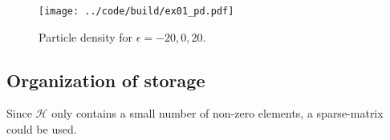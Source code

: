 \begin{figure}[h]
    \centering
    \texttt{[image: ../code/build/ex01\_pd.pdf]}
    \caption{Particle density for $\epsilon = -20, 0, 20$.}
    \label{fig:ex01_2}
\end{figure}

\subsection{ Organization of storage }
Since $\mathcal{H}$ only contains a small number of non-zero elements, a sparse-matrix could be used.